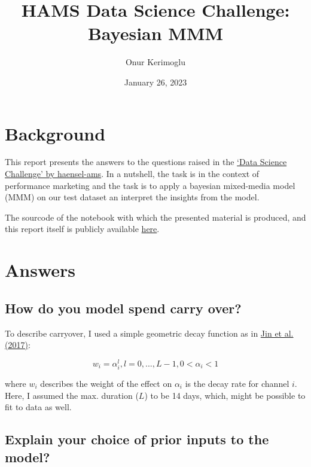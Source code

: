 \documentclass[a4paper,10pt]{scrartcl}
\title{HAMS Data Science Challenge: Bayesian MMM}
\author{Onur Kerimoglu}
\date{January 26, 2023}
\begin{document}
\maketitle

\section{Background}
This report presents the answers to the questions raised in the \href{https://github.com/haensel-ams/recruitment_challenge/tree/master/DataScience_202209}{`Data Science Challenge' by haensel-ams}. In a nutshell, the task is in the context of performance marketing and the task is to apply a bayesian mixed-media model (MMM) on our test dataset an interpret the insights from the model.

The sourcode of the notebook with which the presented material is produced, and this report itself is publicly available \href{https://github.com/OnurKerimoglu/bayesian_mmm}{here}.

\section{Answers}

\subsection{How do you model spend carry over?}

To describe carryover, I used a simple geometric decay function as in \href{https://static.googleusercontent.com/media/research.google.com/en//pubs/archive/46001.pdf}{Jin et al. (2017)}:

\begin{equation}\label{eq:carryover}
 w_i = \alpha_i^l, l=0,...,L-1, 0<\alpha_i<1
\end{equation}

where $w_i$ describes the weight of the effect on   $\alpha_i$ is the decay rate for channel $i$. Here, I assumed the max. duration ($L$) to be 14 days, which, might be possible to fit to data as well.

\subsection {Explain your choice of prior inputs to the model?}
\end{document}
